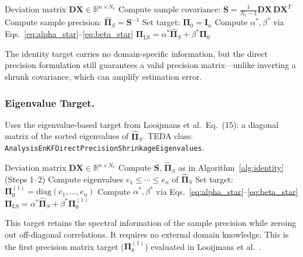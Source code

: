 \begin{algorithm}[t]
\caption{Direct Precision Shrinkage (Identity Target)}
\label{alg:identity}
\begin{algorithmic}[1]
\REQUIRE Deviation matrix $\mathbf{DX} \in \mathbb{R}^{n \times N_e}$
\STATE Compute sample covariance: $\mathbf{S} = \frac{1}{N_e-1} \mathbf{DX} \, \mathbf{DX}^T$
\STATE Compute sample precision: $\hat{\boldsymbol{\Pi}}_S = \mathbf{S}^{-1}$
\STATE Set target: $\boldsymbol{\Pi}_0 = \mathbf{I}_n$
\STATE Compute $\alpha^*, \beta^*$ via Eqs.~\eqref{eq:alpha_star}--\eqref{eq:beta_star}
\RETURN $\boldsymbol{\Pi}_{\text{LS}} = \alpha^* \hat{\boldsymbol{\Pi}}_S + \beta^* \boldsymbol{\Pi}_0$
\end{algorithmic}
\end{algorithm}

The identity target carries no domain-specific information, but the direct precision formulation still guarantees a valid precision matrix---unlike inverting a shrunk covariance, which can amplify estimation error.

\subsubsection{Eigenvalue Target.}

Uses the eigenvalue-based target from Looijmans et al.\ Eq.~(15): a diagonal matrix of the sorted eigenvalues of $\hat{\boldsymbol{\Pi}}_S$. TEDA class: \texttt{Analysis\-EnKF\-Direct\-Precision\-Shrinkage\-Eigenvalues}.

\begin{algorithm}[t]
\caption{Direct Precision Shrinkage (Eigenvalue Target)}
\label{alg:eigenvalue}
\begin{algorithmic}[1]
\REQUIRE Deviation matrix $\mathbf{DX} \in \mathbb{R}^{n \times N_e}$
\STATE Compute $\mathbf{S}$, $\hat{\boldsymbol{\Pi}}_S$ as in Algorithm~\ref{alg:identity} (Steps 1--2)
\STATE Compute eigenvalues $e_1 \leq \cdots \leq e_n$ of $\hat{\boldsymbol{\Pi}}_S$
\STATE Set target: $\boldsymbol{\Pi}_0^{(1)} = \text{diag}(e_1, \ldots, e_n)$
\STATE Compute $\alpha^*, \beta^*$ via Eqs.~\eqref{eq:alpha_star}--\eqref{eq:beta_star}
\RETURN $\boldsymbol{\Pi}_{\text{LS}} = \alpha^* \hat{\boldsymbol{\Pi}}_S + \beta^* \boldsymbol{\Pi}_0^{(1)}$
\end{algorithmic}
\end{algorithm}

This target retains the spectral information of the sample precision while zeroing out off-diagonal correlations. It requires no external domain knowledge. This is the first precision matrix target ($\boldsymbol{\Pi}_0^{(1)}$) evaluated in Looijmans et al.~\cite{looijmans2024comparison}.

